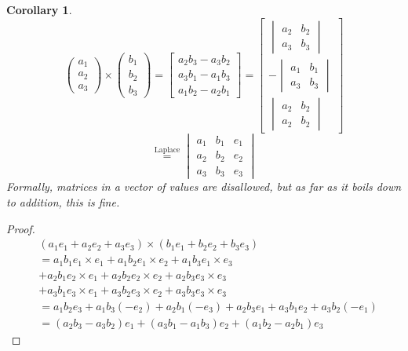 \documentclass[a4paper,landscape,twocolumn]{article}
\newtheorem{cor}{Corollary}
\begin{document}
\begin{cor}
  \label{cor-8.10}
  \[
    \begin{pmatrix}
      a_1 \\ a_2 \\ a_3
    \end{pmatrix} \times
    \begin{pmatrix}
      b_1 \\ b_2 \\ b_3
    \end{pmatrix}
    = \begin{bmatrix}
      a_2 b_3 - a_3 b_2 \\
      a_3 b_1 - a_1 b_3 \\
      a_1 b_2 - a_2 b_1
    \end{bmatrix}
    = \begin{bmatrix}
      \begin{vmatrix}
        a_2 & b_2 \\
        a_3 & b_3
      \end{vmatrix} \\
      -
      \begin{vmatrix}
        a_1 & b_1 \\
        a_3 & b_3
      \end{vmatrix} \\
      \begin{vmatrix}
        a_2 & b_2 \\
        a_2 & b_2
      \end{vmatrix}
    \end{bmatrix}
  \] \[
    \overset{\text{Laplace}}{=}
    \begin{vmatrix}
      a_1 & b_1 & e_1 \\
      a_2 & b_2 & e_2 \\
      a_3 & b_3 & e_3
    \end{vmatrix}
  \]
  Formally, matrices in a vector of values are disallowed,
  but as far as it boils down to addition, this is fine.
\end{cor}

\begin{proof}
  \begin{align*}
    & (a_1 e_1 + a_2 e_2 + a_3 e_3) \times (b_1 e_1 + b_2 e_2 + b_3 e_3) \\
    &= a_1 b_1 e_1 \times e_1 + a_1 b_2 e_1 \times e_2 + a_1 b_3 e_1 \times e_3 \\
    &+ a_2 b_1 e_2 \times e_1 + a_2 b_2 e_2 \times e_2 + a_2 b_3 e_3 \times e_3 \\
    &+ a_3 b_1 e_3 \times e_1 + a_3 b_2 e_3 \times e_2 + a_3 b_3 e_3 \times e_3 \\
    &= a_1 b_2 e_3 + a_1 b_3 (-e_2)
    + a_2 b_1 (-e_3) + a_2 b_3 e_1 +
    a_3 b_1 e_2 + a_3 b_2 (-e_1) \\
    &= (a_2 b_3 - a_3 b_2) e_1 + (a_3 b_1 - a_1 b_3) e_2 + (a_1 b_2 - a_2 b_1) e_3
  \end{align*}
\end{proof}
\end{document}
